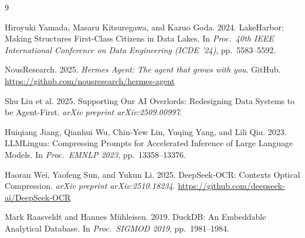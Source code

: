 \documentclass[sigconf]{acmart}
\begin{document}

\begin{thebibliography}{9}

Hiroyuki Yamada, Masaru Kitsuregawa, and Kazuo Goda. 2024.
\newblock LakeHarbor: Making Structures First-Class Citizens in Data Lakes.
\newblock In \textit{Proc.\ 40th IEEE International Conference on Data Engineering (ICDE '24)}, pp.\ 5583--5592.

NousResearch. 2025.
\newblock \textit{Hermes Agent: The agent that grows with you}.
\newblock GitHub. \url{https://github.com/nousresearch/hermes-agent}

Shu Liu et al. 2025.
\newblock Supporting Our AI Overlords: Redesigning Data Systems to be Agent-First.
\newblock \textit{arXiv preprint arXiv:2509.00997}.

Huiqiang Jiang, Qianhui Wu, Chin-Yew Lin, Yuqing Yang, and Lili Qiu. 2023.
\newblock LLMLingua: Compressing Prompts for Accelerated Inference of Large Language Models.
\newblock In \textit{Proc.\ EMNLP 2023}, pp.\ 13358--13376.

Haoran Wei, Yaofeng Sun, and Yukun Li. 2025.
\newblock DeepSeek-OCR: Contexts Optical Compression.
\newblock \textit{arXiv preprint arXiv:2510.18234}.
\newblock \url{https://github.com/deepseek-ai/DeepSeek-OCR}

Mark Raasveldt and Hannes M{\"u}hleisen. 2019.
\newblock DuckDB: An Embeddable Analytical Database.
\newblock In \textit{Proc.\ SIGMOD 2019}, pp.\ 1981--1984.

\end{thebibliography}
\end{document}
